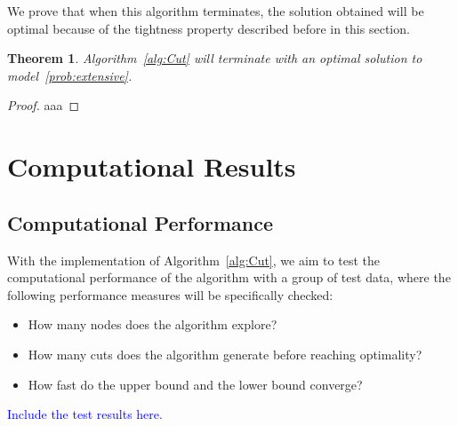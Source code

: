 \documentclass[11pt]{article}
\newtheorem{theorem}{Theorem}
\newcommand{\noi}{\noindent}
\begin{document}
	\noi We prove that when this algorithm terminates, the solution obtained will be optimal because of the tightness property described before in this section.
	\begin{theorem}
		Algorithm~\ref{alg:Cut} will terminate with an optimal solution to model~\eqref{prob:extensive}.
	\end{theorem}
	\begin{proof}
		aaa
	\end{proof}
\section{Computational Results} \label{sec:results}
	\subsection{Computational Performance}
		With the implementation of Algorithm~\ref{alg:Cut}, we aim to test the computational performance of the algorithm with a group of test data, where the following performance measures will be specifically checked:
		\begin{itemize}
			\item How many nodes does the algorithm explore?
			\item How many cuts does the algorithm generate before reaching optimality?
			\item How fast do the upper bound and the lower bound converge?
		\end{itemize}
		\textcolor{blue}{Include the test results here.}
\end{document}
